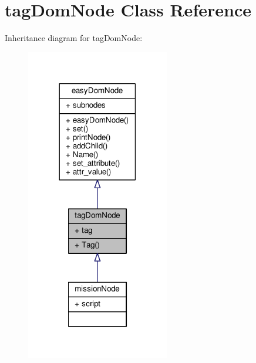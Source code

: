 \hypertarget{classtagDomNode}{}\section{tag\+Dom\+Node Class Reference}
\label{classtagDomNode}


Inheritance diagram for tag\+Dom\+Node\+:
\nopagebreak
\begin{figure}[H]
\begin{center}
\leavevmode
\includegraphics[width=177pt]{dc/d26/classtagDomNode__inherit__graph}
\end{center}
\end{figure}


